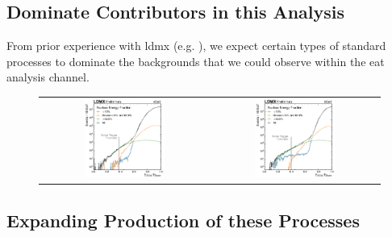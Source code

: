 \subsection{Dominate Contributors in this Analysis}
From prior experience with \ac{ldmx} (e.g. \cite{ldmx-whitepaper,ldmx-photon-reject-2020}),
we expect certain types of standard processes to dominate the backgrounds that we could observe
within the \ac{eat} analysis channel.


\begin{figure}
  \centering
  \begin{tabular}{cc}
    \includegraphics[width=0.49\textwidth]{figures/ldmx/simulation/4gev-ecal-by-nuc.pdf}
    &
    \includegraphics[width=0.49\textwidth]{figures/ldmx/simulation/8gev-ecal-by-nuc.pdf}
  \end{tabular}
  \caption{}
  \label{fig:rec-efrac-by-nuc}
\end{figure}

\subsection{Expanding Production of these Processes}

